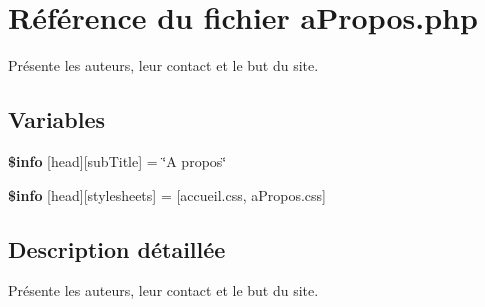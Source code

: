 \hypertarget{aPropos_8php}{}\section{Référence du fichier a\+Propos.\+php}
\label{aPropos_8php}


Présente les auteurs, leur contact et le but du site.  


\subsection*{Variables}
\begin{DoxyCompactItemize}
\item 
\mbox{\label{aPropos_8php_a024f87f9bf4f3b33710e2e7ff8f60823}} 
{\bfseries \$info} \mbox{[}\textquotesingle{}head\textquotesingle{}\mbox{]}\mbox{[}\textquotesingle{}sub\+Title\textquotesingle{}\mbox{]} = \char`\"{}A propos\char`\"{}
\item 
\mbox{\label{aPropos_8php_af6044c8bf78ebc8c58057e14d7738bbd}} 
{\bfseries \$info} \mbox{[}\textquotesingle{}head\textquotesingle{}\mbox{]}\mbox{[}\textquotesingle{}stylesheets\textquotesingle{}\mbox{]} = \mbox{[}\textquotesingle{}accueil.\+css\textquotesingle{}, \textquotesingle{}a\+Propos.\+css\textquotesingle{}\mbox{]}
\end{DoxyCompactItemize}


\subsection{Description détaillée}
Présente les auteurs, leur contact et le but du site. 

